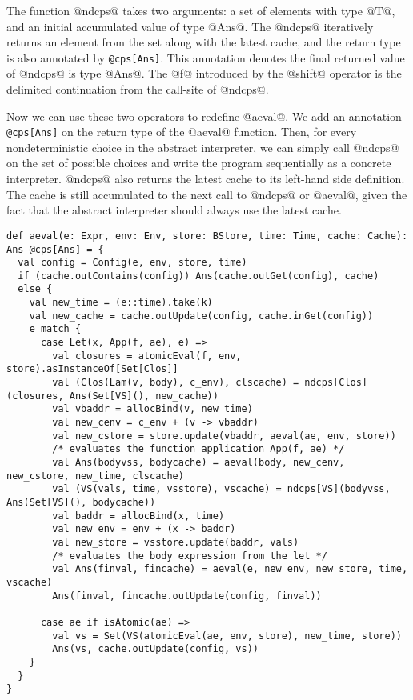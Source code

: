 \documentclass[acmsmall]{acmart}\settopmatter{}
\begin{document}
The function @ndcps@ takes two arguments: a set of elements with type @T@, 
and an initial accumulated value of type @Ans@.
The @ndcps@ iteratively returns an element from the set along with the latest cache, 
and the return type is also annotated by \verb|@cps[Ans]|. 
This annotation denotes the final returned value of @ndcps@ is type @Ans@.
The @f@ introduced by the @shift@ operator is the delimited continuation from the call-site of @ndcps@.

Now we can use these two operators to redefine @aeval@.
We add an annotation \verb|@cps[Ans]| on the return type of the @aeval@ function.
Then, for every nondeterministic choice in the abstract interpreter, we can simply call 
@ndcps@ on the set of possible choices and write the program sequentially as a concrete interpreter.
@ndcps@ also returns the latest cache to its left-hand side definition.
The cache is still accumulated to the next call to @ndcps@ or @aeval@, 
given the fact that the abstract interpreter should always use the latest cache.

\begin{lstlisting}
def aeval(e: Expr, env: Env, store: BStore, time: Time, cache: Cache): Ans @cps[Ans] = {
  val config = Config(e, env, store, time)
  if (cache.outContains(config)) Ans(cache.outGet(config), cache)
  else {
    val new_time = (e::time).take(k)
    val new_cache = cache.outUpdate(config, cache.inGet(config))
    e match {
      case Let(x, App(f, ae), e) =>
        val closures = atomicEval(f, env, store).asInstanceOf[Set[Clos]]
        val (Clos(Lam(v, body), c_env), clscache) = ndcps[Clos](closures, Ans(Set[VS](), new_cache))
        val vbaddr = allocBind(v, new_time)
        val new_cenv = c_env + (v -> vbaddr)
        val new_cstore = store.update(vbaddr, aeval(ae, env, store))
        /* evaluates the function application App(f, ae) */
        val Ans(bodyvss, bodycache) = aeval(body, new_cenv, new_cstore, new_time, clscache)
        val (VS(vals, time, vsstore), vscache) = ndcps[VS](bodyvss, Ans(Set[VS](), bodycache))
        val baddr = allocBind(x, time)
        val new_env = env + (x -> baddr)
        val new_store = vsstore.update(baddr, vals)
        /* evaluates the body expression from the let */
        val Ans(finval, fincache) = aeval(e, new_env, new_store, time, vscache)
        Ans(finval, fincache.outUpdate(config, finval))

      case ae if isAtomic(ae) =>
        val vs = Set(VS(atomicEval(ae, env, store), new_time, store))
        Ans(vs, cache.outUpdate(config, vs))
    }
  }
}
\end{lstlisting}
\end{document}
